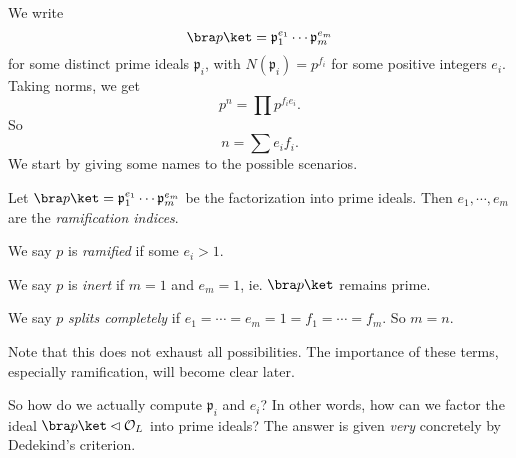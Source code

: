 \documentclass[a4paper]{article}
\begin{document}
We write
\[
  \bra p\ket = \mathfrak{p}_1^{e_1} \cdots \mathfrak{p}_m^{e_m}
\]
for some distinct prime ideals $\mathfrak{p}_i$, with $N(\mathfrak{p}_i) = p^{f_i}$ for some positive integers $e_i$. Taking norms, we get
\[
  p^n = \prod p^{f_i e_i}.
\]
So
\[
  n = \sum e_i f_i.
\]
We start by giving some names to the possible scenarios.
\begin{defi}
  Let $\bra p\ket = \mathfrak{p}_1^{e_1} \cdots \mathfrak{p}_m^{e_m}$ be the factorization into prime ideals. Then $e_1, \cdots, e_m$ are the \emph{ramification indices}.
\end{defi}

\begin{defi}
  We say $p$ is \emph{ramified} if some $e_i > 1$.
\end{defi}

\begin{defi}
  We say $p$ is \emph{inert} if $m = 1$ and $e_m = 1$, ie. $\bra p\ket$ remains prime.
\end{defi}

\begin{defi}
  We say $p$ \emph{splits completely} if $e_1 = \cdots = e_m = 1 = f_1 = \cdots = f_m$. So $m = n$.
\end{defi}
Note that this does not exhaust all possibilities. The importance of these terms, especially ramification, will become clear later.

So how do we actually compute $\mathfrak{p}_i$ and $e_i$? In other words, how can we factor the ideal $\bra p\ket \lhd \mathcal{O}_L$ into prime ideals? The answer is given \emph{very} concretely by Dedekind's criterion.
\end{document}
